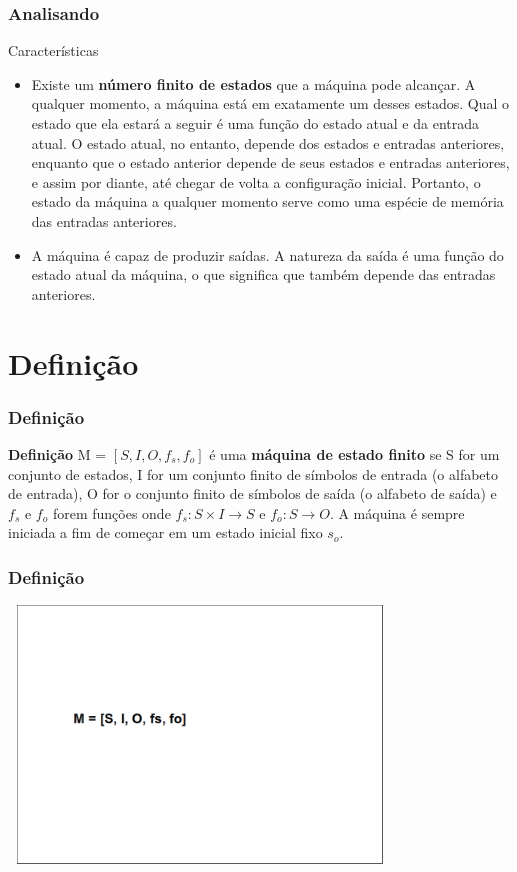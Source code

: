 \documentclass{beamer}
\begin{document}
\begin{frame}
  \frametitle{Analisando}

  \begin{block}{Características}
    \begin{itemize}
      \item Existe um \textbf{número finito de estados} que a máquina pode 
        alcançar. A qualquer momento, a máquina está em exatamente um desses 
	      estados. Qual o estado que ela estará a seguir é uma função do estado 
        atual e da entrada atual. O estado atual, no entanto, depende dos 
        estados e entradas anteriores, enquanto que o estado anterior depende 
        de seus estados e entradas anteriores, e assim por diante, até chegar 
        de volta a configuração inicial. Portanto, o estado da máquina a 
        qualquer momento serve como uma espécie de memória das entradas 
        anteriores.
        \pause
      \item A máquina é capaz de produzir saídas. A natureza da saída é uma 
        função do estado atual da máquina, o que significa que também depende 
	      das entradas anteriores.
    \end{itemize}
  \end{block}
\end{frame}

\section{Definição}

\begin{frame}
  \frametitle{Definição}
  \begin{block}{\textbf{Definição}}
    M = $[S, I, O, f_s, f_o]$ é uma \textbf{máquina de estado finito} se S for 
    um conjunto de estados, I for um conjunto finito de símbolos de entrada (o 
    alfabeto de entrada), O for o conjunto finito de símbolos de saída (o 
    alfabeto de saída) e $f_s$ e $f_o$ forem funções onde
    $f_s: S\times I \xrightarrow{} S$ e $f_o: S \xrightarrow{} O$. A máquina é 
    sempre iniciada a fim de começar em um estado inicial fixo $s_o$. 
  \end{block}
\end{frame}

\begin{frame}
  \frametitle{Definição}
    \includegraphics[height=2.7in, width=4in]{images/entendendo_definicao_1.png}
\end{frame}
\end{document}
